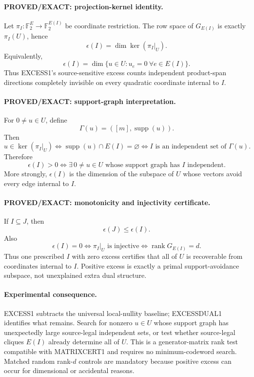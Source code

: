 \documentclass[11pt]{article}
\begin{document}
\paragraph{PROVED/EXACT: projection-kernel identity.}
Let \(\pi_I:\mathbb F_2^E\to\mathbb F_2^{E(I)}\) be coordinate restriction. The row space of \(G_{E(I)}\) is exactly \(\pi_I(U)\), hence
\[
\boxed{\epsilon(I)=\dim\ker(\pi_I|_U).}
\]
Equivalently,
\[
\boxed{
\epsilon(I)=
\dim\{u\in U:u_e=0\ \forall e\in E(I)\}.
}
\]
Thus EXCESS1's source-sensitive excess counts independent product-span directions completely invisible on every quadratic coordinate internal to \(I\).

\paragraph{PROVED/EXACT: support-graph interpretation.}
For \(0\ne u\in U\), define
\[
\Gamma(u)=([m],\operatorname{supp}(u)).
\]
Then
\[
u\in\ker(\pi_I|_U)
\iff
\operatorname{supp}(u)\cap E(I)=\varnothing
\iff
I\text{ is an independent set of }\Gamma(u).
\]
Therefore
\[
\boxed{
\epsilon(I)>0
\iff
\exists\,0\ne u\in U\text{ whose support graph has }I\text{ independent}.
}
\]
More strongly, \(\epsilon(I)\) is the dimension of the subspace of \(U\) whose vectors avoid every edge internal to \(I\).

\paragraph{PROVED/EXACT: monotonicity and injectivity certificate.}
If \(I\subseteq J\), then
\[
\boxed{\epsilon(J)\le\epsilon(I).}
\]
Also
\[
\boxed{
\epsilon(I)=0
\iff
\pi_I|_U\text{ is injective}
\iff
\operatorname{rank}G_{E(I)}=d.
}
\]
Thus one prescribed \(I\) with zero excess certifies that all of \(U\) is recoverable from coordinates internal to \(I\). Positive excess is exactly a primal support-avoidance subspace, not unexplained extra dual structure.

\paragraph{Experimental consequence.}
EXCESS1 subtracts the universal local-nullity baseline; EXCESSDUAL1 identifies what remains. Search for nonzero \(u\in U\) whose support graph has unexpectedly large source-legal independent sets, or test whether source-legal cliques \(E(I)\) already determine all of \(U\). This is a generator-matrix rank test compatible with MATRIXCERT1 and requires no minimum-codeword search. Matched random rank-\(d\) controls are mandatory because positive excess can occur for dimensional or accidental reasons.
\end{document}

